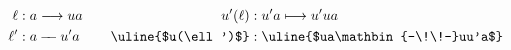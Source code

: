 \[
\begin{aligned}
\ell &: a\longrightarrow ua\\
\ell' &: a\mathbin{-\!\!-}u'a
\end{aligned}
\qquad
\begin{aligned}
u'(\ell)&:u'a\longmapsto u'ua\\
\uline{$u(\ell')$}&:\uline{$ua\mathbin{-\!\!-}uu'a$}
\end{aligned}
\]
